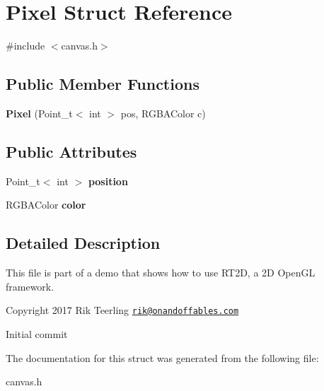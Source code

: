 \hypertarget{struct_pixel}{}\section{Pixel Struct Reference}
\label{struct_pixel}


{\ttfamily \#include $<$canvas.\+h$>$}

\subsection*{Public Member Functions}
\begin{DoxyCompactItemize}
\item 
\mbox{\label{struct_pixel_ac391c63d8fc2e5fd53eba7ef50947e3c}} 
{\bfseries Pixel} (Point\+\_\+t$<$ int $>$ pos, R\+G\+B\+A\+Color c)
\end{DoxyCompactItemize}
\subsection*{Public Attributes}
\begin{DoxyCompactItemize}
\item 
\mbox{\label{struct_pixel_ae5a03b3f31635f11b67174b42a01fd40}} 
Point\+\_\+t$<$ int $>$ {\bfseries position}
\item 
\mbox{\label{struct_pixel_a035e2b936f417557664f69a06e32ed88}} 
R\+G\+B\+A\+Color {\bfseries color}
\end{DoxyCompactItemize}


\subsection{Detailed Description}
This file is part of a demo that shows how to use R\+T2D, a 2D Open\+GL framework.


\begin{DoxyItemize}
\item Copyright 2017 Rik Teerling \href{mailto:rik@onandoffables.com}{\tt rik@onandoffables.\+com}
\begin{DoxyItemize}
\item Initial commit 
\end{DoxyItemize}
\end{DoxyItemize}

The documentation for this struct was generated from the following file\+:\begin{DoxyCompactItemize}
\item 
canvas.\+h\end{DoxyCompactItemize}
